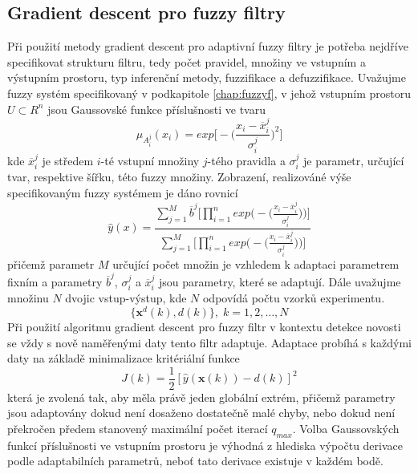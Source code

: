 \subsection{Gradient descent pro fuzzy filtry}\label{chap:gd}
Při použití metody gradient descent pro adaptivní fuzzy filtry je potřeba nejdříve specifikovat strukturu filtru, tedy počet pravidel, množiny ve vstupním a výstupním prostoru, typ inferenční metody, fuzzifikace a defuzzifikace. Uvažujme fuzzy systém specifikovaný v podkapitole \ref{chap:fuzzyf}, v jehož vstupním prostoru $U\subset R^n$ jsou Gaussovské funkce příslušnosti ve tvaru
\begin{equation}
    \mu_{A^j_i}(x_i)= exp\Bigg[-\Bigg(\frac{x_i-\overline{x}_i^j}{\sigma_i^j}\Bigg)^2\Bigg]
\end{equation}
kde $\overline{x}_i^j$ je středem $i$-té vstupní množiny $j$-tého pravidla a $\sigma_i^j$ je parametr, určující tvar, respektive šířku, této fuzzy množiny. Zobrazení, realizováné výše specifikovaným fuzzy systémem je dáno rovnicí
\begin{equation}
    \hat{y}(x)=\frac{\sum_{j=1}^M \overline{b}^j\Big[\prod_{i=1}^n exp\Big(-\Big(\frac{x_i-\overline{x}_i^j}{\sigma_i^j}\Big)\Big)\Big]}{\sum_{j=1}^M \Big[\prod_{i=1}^n exp\Big(-\Big(\frac{x_i-\overline{x}_i^j}{\sigma_i^j}\Big)\Big)\Big]}
\end{equation}
přičemž parametr $M$ určující počet množin je vzhledem k adaptaci parametrem fixním a parametry $\overline{b}^j$, $\sigma_i^j$ a $\overline{x}_i^j$ jsou parametry, které se adaptují. Dále uvažujme množinu $N$ dvojic vstup-výstup, kde $N$ odpovídá počtu vzorků experimentu. 
\begin{equation}
    \{\textbf{x}^d(k), d(k) \}, \; k=1,2,\dots,N
\end{equation}
Při použití algoritmu gradient descent pro fuzzy filtr v kontextu detekce novosti se vždy s nově naměřenými daty tento filtr adaptuje. Adaptace probíhá s každými daty na základě minimalizace kritériální funkce
\begin{equation}
    J(k)=\frac{1}{2}[\hat{y}(\textbf{x}(k))-d(k)]^2
\end{equation}
která je zvolená tak, aby měla právě jeden globální extrém, přičemž parametry jsou adaptovány dokud není dosaženo dostatečně malé chyby, nebo dokud není překročen předem stanovený maximální počet iterací $q_{max}$. Volba Gaussovských funkcí příslušnosti ve vstupním prostoru je výhodná z hlediska výpočtu derivace podle adaptabilních parametrů, neboť tato derivace existuje v každém bodě.

